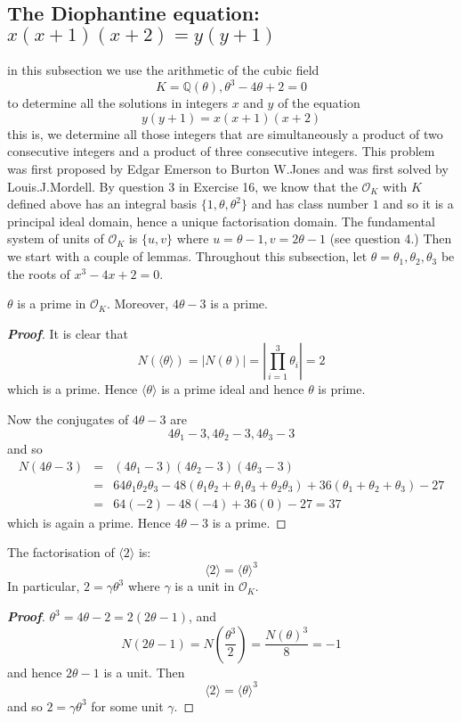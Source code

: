 \subsection{The Diophantine equation: $x(x+1)(x+2)=y(y+1)$}
in this subsection we use the arithmetic of the cubic field
$$K=\mathbb{Q}(\theta), \theta^3-4\theta+2=0$$
to determine all the solutions in integers $x$ and $y$ of the equation
$$y(y+1)=x(x+1)(x+2)$$
this is, we determine all those integers that are simultaneously a product of two consecutive integers and a product of three consecutive integers. This problem was first proposed by Edgar Emerson to Burton W.Jones and was first solved by Louis.J.Mordell.
By question 3 in Exercise 16, we know that the $\mathcal{O}_K$ with $K$ defined above has an
integral basis $\{1,\theta,\theta^2\}$ and has class number $1$ and so it is a principal ideal domain,
hence a unique factorisation domain. The fundamental system of units of $\mathcal{O}_K$ is $\{u,v\}$ where $u=\theta-1,v=2\theta-1$ (see question 4.)
Then we start with a couple of lemmas. Throughout this subsection, let $\theta=\theta_1,\theta_2,\theta_3$ be the roots of $x^3-4x+2=0$.
\begin{lemma} $\theta$ is a prime in $\mathcal{O}_K$. Moreover, $4\theta-3$ is a prime.
\end{lemma}
\begin{proof}[\bf Proof] It is clear that
$$N(\langle \theta \rangle)=|N(\theta)|=\left|\prod_{i=1}^3 \theta_i\right|=2$$
which is a prime. Hence $\langle \theta \rangle$ is a prime ideal and hence $\theta$ is prime.

Now the conjugates of $4\theta-3$ are
$$4\theta_1-3,4\theta_2-3,4\theta_3-3$$
and so
\begin{eqnarray*}
N(4\theta-3)&=&(4\theta_1-3)(4\theta_2-3)(4\theta_3-3)\\
&=&64\theta_1\theta_2\theta_3-48(\theta_1\theta_2+\theta_1\theta_3+\theta_2\theta_3)+36(\theta_1+\theta_2+\theta_3)
-27\\
&=&64(-2)-48(-4)+36(0)-27 =37
\end{eqnarray*}
which is again a prime. Hence $4\theta-3$ is a prime.
\end{proof}
\begin{lemma} The factorisation of $\langle 2\rangle$ is:
$$\langle 2\rangle=\langle \theta \rangle^3$$
In particular, $2=\gamma\theta^3$ where $\gamma$ is a unit in $\mathcal{O}_K$.
\end{lemma}
\begin{proof}[\bf Proof] $\theta^3=4\theta-2=2(2\theta-1)$, and
$$N(2\theta-1)=N(\frac{\theta^3}{2})=\frac{N(\theta)^3}{8}=-1$$
and hence $2\theta-1$ is a unit. Then
$$\langle 2 \rangle=\langle \theta \rangle^3$$
and so $2=\gamma \theta^3$ for some unit $\gamma$.
\end{proof}

